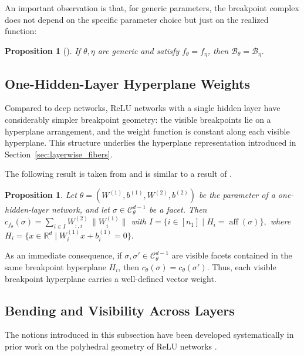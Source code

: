 \documentclass{article}
\newtheorem{prop}[theorem]{Proposition}
\theoremstyle{definition}
\newcommand{\aff}{\operatorname{aff}}
\newcommand{\R}{\mathbb{R}}
\newcommand{\weights}[1]{W^{(#1)}}
\newcommand{\bias}[1]{b^{(#1)}}
\newcommand{\complex}{\mathcal{C}}
\newcommand{\bcomplex}[1]{\mathcal{B}_{#1}}
\begin{document}
An important observation is that, for generic parameters, the breakpoint complex does not depend on the specific parameter choice but just on the realized function: 

 \begin{prop}  [\citealp{grillo2026relunetworksadmitidentifiable}]
\label{prop:canonicalbcomplex}
If $\theta,\eta$ are generic and satisfy $f_\theta=f_\eta$, then
$\bcomplex{\theta}=\bcomplex{\eta}.$
\end{prop}


\subsection{One-Hidden-Layer Hyperplane Weights}
\label{app:one_hidden_layer_weights}

Compared to deep networks, ReLU networks with a single hidden layer have considerably simpler breakpoint geometry: 
the visible breakpoints lie on a hyperplane arrangement, and the weight function is constant along each
visible hyperplane. 
This structure underlies the hyperplane representation introduced in Section~\ref{sec:layerwise_fibers}. 

The following result is taken from \citet{grillo2026relunetworksadmitidentifiable} and is similar to a result of \cite{PetzkaTS20}. 

\begin{prop}
\label{prop:tropical_weight_1layer}
Let $\theta=(\weights{1},\bias{1},\weights{2},\bias{2})$ be the parameter of a one-hidden-layer
network, and let $\sigma\in\complex_\theta^{d-1}$ be a facet. Then
$
c_{f_\theta}(\sigma)
=
\sum_{i\in I}\weights{2}_{:,i}\,\|\weights{1}_i\|$ with $
I=\{i\in[n_1]\mid H_i=\aff(\sigma)\},
$
where
$
H_i=\{x\in\R^d \mid  \weights{1}_ix+\bias{1}_i=0\}.
$
\end{prop}

As an immediate consequence, if $\sigma,\sigma' \in \complex_\theta^{d-1}$ are visible facets
contained in the same breakpoint hyperplane $H_i$, then
$c_\theta(\sigma)=c_\theta(\sigma')$. 
Thus, each visible breakpoint hyperplane carries a well-defined vector weight. 


\subsection{Bending and Visibility Across Layers}
\label{app:bending_visibility}

The notions introduced in this subsection have been developed systematically in prior work on the polyhedral geometry of ReLU networks \citep[see especially][]{phuong2020functional,rolnick2020reverse,grigsby2023hiddensymmetriesrelunetworks,grillo2026relunetworksadmitidentifiable}. 
\end{document}

